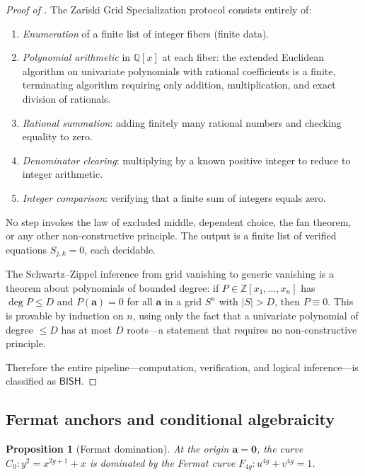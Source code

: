\documentclass[11pt]{article}
\theoremstyle{plain}
\newtheorem{proposition}[theorem]{Proposition}
\theoremstyle{definition}
\theoremstyle{remark}
\newcommand{\ZZ}{\mathbb{Z}}
\newcommand{\QQ}{\mathbb{Q}}
\newcommand{\BISH}{\mathsf{BISH}}
\begin{document}
\begin{proof}[Proof of ]
The Zariski Grid Specialization protocol consists entirely of:
\begin{enumerate}[nosep]
  \item \emph{Enumeration} of a finite list of integer fibers (finite data).
  \item \emph{Polynomial arithmetic} in $\QQ[x]$ at each fiber: the
    extended Euclidean algorithm on univariate polynomials with rational
    coefficients is a finite, terminating algorithm requiring only
    addition, multiplication, and exact division of rationals.
  \item \emph{Rational summation}: adding finitely many rational numbers
    and checking equality to zero.
  \item \emph{Denominator clearing}: multiplying by a known positive
    integer to reduce to integer arithmetic.
  \item \emph{Integer comparison}: verifying that a finite sum of
    integers equals zero.
\end{enumerate}
No step invokes the law of excluded middle, dependent choice, the fan
theorem, or any other non-constructive principle.  The output is a finite
list of verified equations $S_{j,k} = 0$, each decidable.

The Schwartz--Zippel inference from grid vanishing to generic vanishing
is a theorem about polynomials of bounded degree: if $P \in \ZZ[x_1,
\ldots, x_n]$ has $\deg P \leq D$ and $P(\mathbf{a}) = 0$ for all
$\mathbf{a}$ in a grid $S^n$ with $|S| > D$, then $P \equiv 0$.
This is provable by induction on $n$, using only the fact that a
univariate polynomial of degree $\leq D$ has at most $D$ roots---a
statement that requires no non-constructive principle.

Therefore the entire pipeline---computation, verification, and
logical inference---is classified as $\BISH$.
\end{proof}

\subsection{Fermat anchors and conditional algebraicity}
\label{sec:fermat}

\begin{proposition}[Fermat domination]\label{prop:fermat}
At the origin $\mathbf{a} = \mathbf{0}$, the curve
$C_0: y^2 = x^{2g+1} + x$ is dominated by the Fermat curve
$F_{4g}: u^{4g} + v^{4g} = 1$.
\end{proposition}
\end{document}
